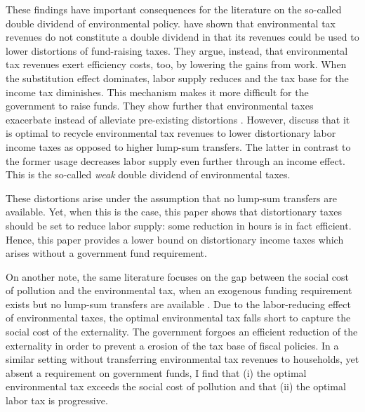 These findings have important consequences for the literature on the so-called double dividend of environmental policy. 
\cite{LansBovenberg1994EnvironmentalTaxation} have shown that environmental tax revenues do not constitute a double dividend in that its revenues could be used to lower distortions of fund-raising taxes. 
They argue, instead, that environmental tax revenues exert efficiency costs, too, by lowering the gains from work. When the substitution effect dominates, labor supply reduces and the tax base for the income tax diminishes. This mechanism makes it more difficult for the government to raise funds. They show further that environmental taxes exacerbate instead of alleviate pre-existing distortions .  However, \cite{LansBovenberg1994EnvironmentalTaxation} discuss that it is optimal to recycle environmental tax revenues to lower distortionary labor income taxes as opposed to higher lump-sum transfers. The latter in contrast to the former usage decreases labor supply even further through an income effect. This is the so-called \textit{weak} double dividend of environmental taxes.  

These distortions arise under the assumption that no lump-sum transfers are available. Yet, when this is the case, this paper shows that distortionary taxes should be set to reduce labor supply: some reduction in hours is in fact efficient. Hence, this paper provides a lower bound on distortionary income taxes which arises without a government fund requirement.

On another note, the same literature focuses on the gap between the social cost of pollution and the environmental tax, when an exogenous funding requirement exists but no lump-sum transfers are available \cite{LansBovenberg1994EnvironmentalTaxation, LansBovenberg1996OptimalAnalyses, Barrage2019OptimalPolicy}. 
Due to the labor-reducing effect of environmental taxes, the optimal environmental tax   falls short to capture the social cost of the externality. 
The government forgoes an efficient reduction of the externality in order to prevent a erosion of the tax base of fiscal policies. 
In a similar setting without transferring environmental tax revenues to households, yet absent a requirement on government funds, I find that (i) the optimal environmental tax exceeds the social cost of pollution and that (ii) the optimal labor tax is progressive. 

